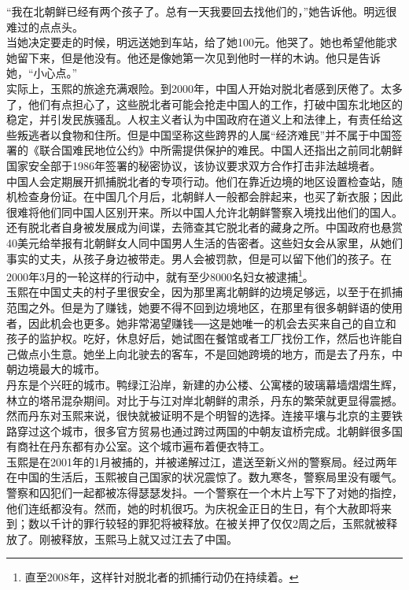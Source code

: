 “我在北朝鲜已经有两个孩子了。总有一天我要回去找他们的，”她告诉他。明远很难过的点点头。\\

当她决定要走的时候，明远送她到车站，给了她100元。他哭了。她也希望他能求她留下来，但是他没有。他还是像她第一次见到他时一样的木讷。他只是告诉她，“小心点。”\\

实际上，玉熙的旅途充满艰险。到2000年，中国人开始对脱北者感到厌倦了。太多了，他们有点担心了，这些脱北者可能会抢走中国人的工作，打破中国东北地区的稳定，并引发民族骚乱。人权主义者认为中国政府在道义上和法律上，有责任给这些叛逃者以食物和住所。但是中国坚称这些跨界的人属“经济难民”并不属于中国签署的《联合国难民地位公约》中所需提供保护的难民。中国人还指出之前同北朝鲜国家安全部于1986年签署的秘密协议，该协议要求双方合作打击非法越境者。\\

中国人会定期展开抓捕脱北者的专项行动。他们在靠近边境的地区设置检查站，随机检查身份证。在中国几个月后，北朝鲜人一般都会胖起来，也买了新衣服；因此很难将他们同中国人区别开来。所以中国人允许北朝鲜警察入境找出他们的国人。还有脱北者自身被发展成为间谍，去筛查其它脱北者的藏身之所。中国政府也悬赏40美元给举报有北朝鲜女人同中国男人生活的告密者。这些妇女会从家里，从她们事实的丈夫，从孩子身边被带走。男人会被罚款，但是可以留下他们的孩子。在2000年3月的一轮这样的行动中，就有至少8000名妇女被逮捕\footnote{直至2008年，这样针对脱北者的抓捕行动仍在持续着。}。\\

玉熙在中国丈夫的村子里很安全，因为那里离北朝鲜的边境足够远，以至于在抓捕范围之外。但是为了赚钱，她要不得不回到边境地区，在那里有很多朝鲜语的使用者，因此机会也更多。她非常渴望赚钱──这是她唯一的机会去买来自己的自立和孩子的监护权。吃好，休息好后，她试图在餐馆或者工厂找份工作，然后也许能自己做点小生意。她坐上向北驶去的客车，不是回她跨境的地方，而是去了丹东，中朝边境最大的城市。\\

丹东是个兴旺的城市。鸭绿江沿岸，新建的办公楼、公寓楼的玻璃幕墙熠熠生辉，林立的塔吊混杂期间。对比于与江对岸北朝鲜的肃杀，丹东的繁荣就更显得震撼。然而丹东对玉熙来说，很快就被证明不是个明智的选择。连接平壤与北京的主要铁路穿过这个城市，很多官方贸易也通过跨过两国的中朝友谊桥完成。北朝鲜很多国有商社在丹东都有办公室。这个城市遍布着便衣特工。\\

玉熙是在2001年的1月被捕的，并被递解过江，遣送至新义州的警察局。经过两年在中国的生活后，玉熙被自己国家的状况震惊了。数九寒冬，警察局里没有暖气。警察和囚犯们一起都被冻得瑟瑟发抖。一个警察在一个木片上写下了对她的指控，他们连纸都没有。然而，她的时机很巧。为庆祝金正日的生日，有个大赦即将来到；数以千计的罪行较轻的罪犯将被释放。在被关押了仅仅2周之后，玉熙就被释放了。刚被释放，玉熙马上就又过江去了中国。\\

